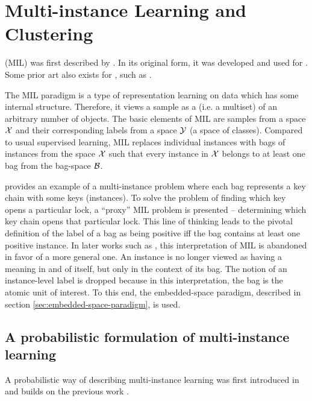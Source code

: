 \section{Multi-instance Learning and Clustering}

 (MIL) was first described by \cite{dietterich_solving_1997}. In its original form, it was developed and used for . Some prior art also exists for , such as \cite{chen_contextual_2012}.

The MIL paradigm is a type of representation learning on data which has some internal structure. Therefore, it views a sample as a  (i.e. a multiset) of an arbitrary number of objects. The basic elements of MIL are samples from a space \( \mathcal{X} \) and their corresponding labels from a space \( \mathcal{Y} \) (a space of classes). Compared to usual supervised learning, MIL replaces individual instances with bags of instances from the space \( \mathcal{X} \) such that every instance in \( \mathcal{X} \) belongs to at least one bag from the bag-space \( \mathcal{B} \).

\cite{dietterich_solving_1997} provides an example of a multi-instance problem where each bag represents a key chain with some keys (instances). To solve the problem of finding which key opens a particular lock, a \enquote{proxy} MIL problem is presented -- determining which key chain opens that particular lock. This line of thinking leads to the pivotal definition of the label of a bag as being positive iff the bag contains at least one positive instance. In later works such as \cite{pevny_using_2017}, this interpretation of MIL is abandoned in favor of a more general one. An instance is no longer viewed as having a meaning in and of itself, but only in the context of its bag. The notion of an instance-level label is dropped because in this interpretation, the bag is the atomic unit of interest. To this end, the embedded-space paradigm, described in section \ref{sec:embedded-space-paradigm}, is used.

\subsection{A probabilistic formulation of multi-instance learning}\label{sec:probabilistic-formalism}
A probabilistic way of describing multi-instance learning was first introduced in \cite{pevny_using_2017} and builds on the previous work \cite{muandet_learning_2012}.

